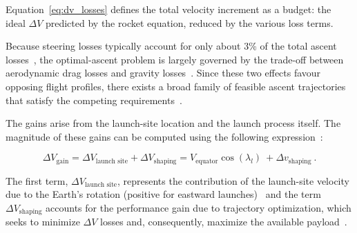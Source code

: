 Equation~\eqref{eq:dv_losses} defines the total velocity increment as a budget: the ideal $\Delta V$ predicted by the rocket equation, reduced by the various loss terms.


Because steering losses typically account for only about 3\% of the total ascent losses~\cite{Edberg}, the optimal-ascent problem is largely governed by the trade-off between aerodynamic drag losses and gravity losses~\cite{Ulrich}. Since these two effects favour opposing flight profiles, there exists a broad family of feasible ascent trajectories that satisfy the competing requirements~\cite{Ulrich}.

The gains arise from the launch-site location and the launch process itself. The magnitude of these gains can be computed using the following expression~\cite{Edberg}:

\begin{equation}
\Delta V_{\text{gain}} = \Delta V_{\text{launch\ site}} + \Delta V_{\text{shaping}} = V_{\text{equator}} \cos (\lambda_l) \ + \Delta v_{\text{shaping}} \ .
\end{equation}

The first term, $\Delta V_{\text{launch site}}$, represents the contribution of the launch-site velocity due to the Earth's rotation (positive for eastward launches)~\cite{Edberg} and the term $\Delta V_{\text{shaping}}$ accounts for the performance gain due to trajectory optimization, which seeks to minimize $\Delta V$ losses and, consequently, maximize the available payload~\cite{Edberg}.

